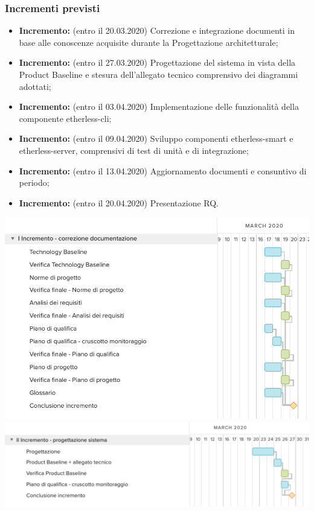 \subsubsection{Incrementi previsti}
\begin{itemize}
	\item \textbf{ Incremento:} (entro il 20.03.2020) Correzione e integrazione documenti in base alle conoscenze acquisite durante la Progettazione architetturale;
	\item \textbf{ Incremento:} (entro il 27.03.2020) Progettazione del sistema in vista della Product Baseline e stesura dell'allegato tecnico comprensivo dei diagrammi adottati;
	\item \textbf{ Incremento:} (entro il 03.04.2020) Implementazione delle funzionalità della componente etherless-cli;
	\item \textbf{ Incremento:} (entro il 09.04.2020) Sviluppo componenti etherless-smart e etherless-server, comprensivi di test di unità e di integrazione;
	\item \textbf{ Incremento:} (entro il 13.04.2020) Aggiornamento documenti e consuntivo di periodo;
	\item \textbf{ Incremento:} (entro il 20.04.2020) Presentazione RQ.
\end{itemize}
	\includegraphics[width=\textwidth]{res/img/gantt/RQ/1}
	\includegraphics[width=\textwidth]{res/img/gantt/RQ/2}
